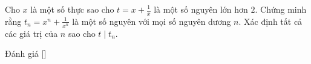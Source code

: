 \ifshowproblem
\begin{problem}\label{problem:GBR-2015-MO1-P4}
    Cho \( x \) là một số thực sao cho \( t = x + \frac{1}{x} \) là một số nguyên lớn hơn \( 2 \).  
    Chứng minh rằng \( t_n = x^n + \frac{1}{x^n} \) là một số nguyên với mọi số nguyên dương \( n \).  
    Xác định tất cả các giá trị của \( n \) sao cho \( t \mid t_n \).
\end{problem}
\fi

\ifshowinfo
Đánh giá [\textbf{}]
\fi